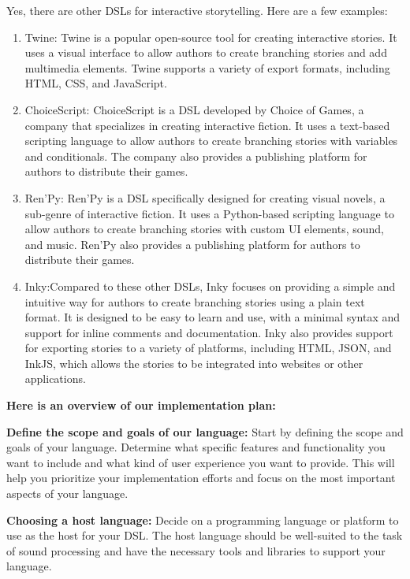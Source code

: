 Yes, there are other DSLs for interactive storytelling. Here are a few examples:
 \begin{enumerate}
                 \item Twine: Twine is a popular open-source tool for creating interactive stories. It uses a visual interface to allow authors to create branching stories and add multimedia elements. Twine supports a variety of export formats, including HTML, CSS, and JavaScript.
                 \item ChoiceScript: ChoiceScript is a DSL developed by Choice of Games, a company that specializes in creating interactive fiction. It uses a text-based scripting language to allow authors to create branching stories with variables and conditionals. The company also provides a publishing platform for authors to distribute their games.
                 \item Ren'Py: Ren'Py is a DSL specifically designed for creating visual novels, a sub-genre of interactive fiction. It uses a Python-based scripting language to allow authors to create branching stories with custom UI elements, sound, and music. Ren'Py also provides a publishing platform for authors to distribute their games.
                 \item Inky:Compared to these other DSLs, Inky focuses on providing a simple and intuitive way for authors to create branching stories using a plain text format. It is designed to be easy to learn and use, with a minimal syntax and support for inline comments and documentation. Inky also provides support for exporting stories to a variety of platforms, including HTML, JSON, and InkJS, which allows the stories to be integrated into websites or other applications.
 \end{enumerate}

\textbf {Here is an overview of our implementation plan:}

\textbf {Define the scope and goals of our language:} Start by defining the scope and goals of your language. Determine what specific features and functionality you want to include and what kind of user experience you want to provide. This will help you prioritize your implementation efforts and focus on the most important aspects of your language. 

\textbf {Choosing a host language:} Decide on a programming language or platform to use as the host for your DSL. The host language should be well-suited to the task of sound processing and have the necessary tools and libraries to support your language. 

